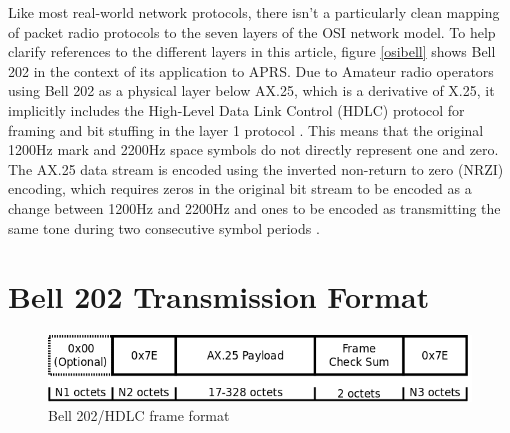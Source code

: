 \documentclass[12pt,letterpaper]{article}
\begin{document}
Like most real-world network protocols, there isn't a particularly clean
mapping of packet radio protocols to the seven layers of the OSI
network model. To help clarify references to the different layers in this article,
figure \ref{osibell} shows Bell 202 in the context of its application
to APRS.
Due to Amateur radio operators
using Bell 202 as a physical layer below AX.25, which is a derivative of
X.25, it implicitly includes the High-Level Data Link Control (HDLC) 
protocol for framing and bit stuffing in the layer 1 protocol \cite{n1vgphy}.
This means that the original 1200Hz mark and 2200Hz space symbols
do not directly represent one and zero.
The AX.25 data stream is encoded using the 
inverted non-return to zero (NRZI) encoding,
which requires zeros in the original bit stream to be encoded as a change
between 1200Hz and 2200Hz and ones to be encoded as transmitting the same
tone during two consecutive symbol periods \cite{iso13239}.

\section{Bell 202 Transmission Format}

\begin{figure}
	\centering
	\includegraphics[width=1.0\textwidth]{src/dia/bell202}
	\caption{Bell 202/HDLC frame format}
	\label{fig:bell202format}
\end{figure}
\end{document}
